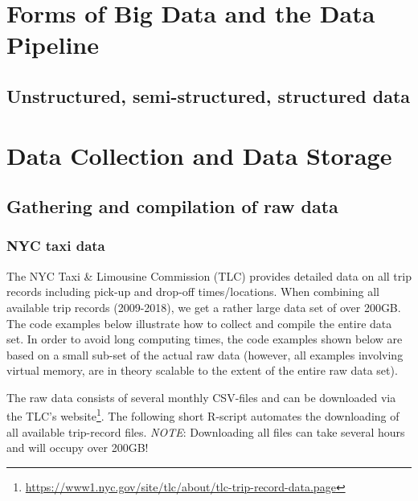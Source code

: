 \documentclass[
  12pt,
]{style/krantz}
\renewcommand{\href}[2]{#2\footnote{\url{#1}}}
\begin{document}
\hypertarget{forms-of-big-data-and-the-data-pipeline}{%
\chapter{Forms of Big Data and the Data Pipeline}\label{forms-of-big-data-and-the-data-pipeline}}

\hypertarget{unstructured-semi-structured-structured-data}{%
\section{Unstructured, semi-structured, structured data}\label{unstructured-semi-structured-structured-data}}

\hypertarget{data-collection-and-data-storage}{%
\chapter{Data Collection and Data Storage}\label{data-collection-and-data-storage}}

\hypertarget{gathering-and-compilation-of-raw-data}{%
\section{Gathering and compilation of raw data}\label{gathering-and-compilation-of-raw-data}}

\hypertarget{nyc-taxi-data}{%
\subsection{NYC taxi data}\label{nyc-taxi-data}}

The NYC Taxi \& Limousine Commission (TLC) provides detailed data on all trip records including pick-up and drop-off times/locations. When combining all available trip records (2009-2018), we get a rather large data set of over 200GB. The code examples below illustrate how to collect and compile the entire data set. In order to avoid long computing times, the code examples shown below are based on a small sub-set of the actual raw data (however, all examples involving virtual memory, are in theory scalable to the extent of the entire raw data set).

The raw data consists of several monthly CSV-files and can be downloaded via the \href{https://www1.nyc.gov/site/tlc/about/tlc-trip-record-data.page}{TLC's website}. The following short R-script automates the downloading of all available trip-record files. \emph{NOTE}: Downloading all files can take several hours and will occupy over 200GB!
\end{document}
